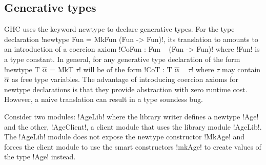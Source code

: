 \documentclass[manuscript,screen,nonacm]{acmart}
\begin{document}
\subsection{Generative types}
GHC uses the keyword newtype to declare generative types. For the type declaration !newtype Fun = MkFun (Fun -> Fun)!, its translation to \SFC amounts to an introduction of a coercion axiom !CoFun : Fun ~ (Fun -> Fun)! where !Fun! is a type constant. In general, for any generative type declaration of the form !newtype T $\overline{\alpha}$ = MkT $\tau$! will be of the form !CoT : T $\overline{\alpha}$ ~ $\tau$! where $\tau$ may contain $\overline{\alpha}$ as free type variables. The advantage of introducing coercion axioms for newtype declarations is that they provide abstraction with zero runtime cost. However,
a naive translation can result in a type soundess bug\cite{TODO}.

Consider two modules: !AgeLib! where the library writer defines a newtype !Age! and the other, !AgeClient!, a client module that uses the library module !AgeLib!. The !AgeLib! module does not expose the newtype constructor !MkAge! and forces the client module to use the smart constructors !mkAge! to create values of the type !Age! instead.
\end{document}
